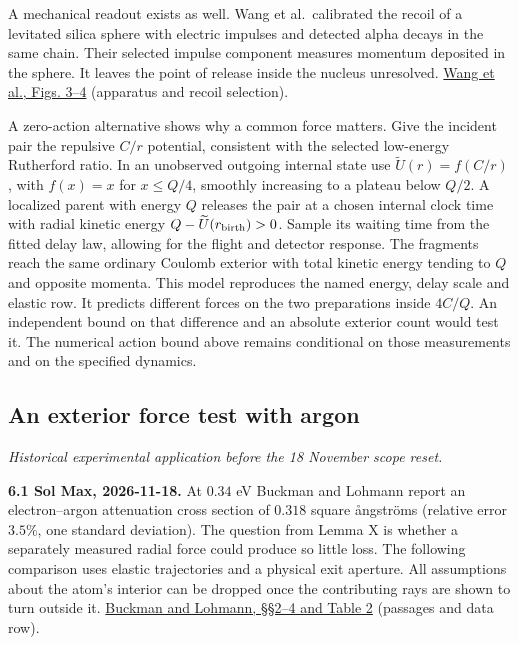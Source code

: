\documentclass[11pt,a4paper]{article}
\begin{document}
A mechanical readout exists as well. Wang et al.~calibrated the recoil
of a levitated silica sphere with electric impulses and detected alpha
decays in the same chain. Their selected impulse component measures
momentum deposited in the sphere. It leaves the point of release inside
the nucleus unresolved. \href{https://arxiv.org/pdf/2402.13257v2}{Wang
et al., Figs. 3--4} (apparatus and recoil selection).

A zero-action alternative shows why a common force matters. Give the
incident pair the repulsive \(C/r\) potential, consistent with the
selected low-energy Rutherford ratio. In an unobserved outgoing internal
state use \(\widetilde U(r)=f(C/r)\), with \(f(x)=x\) for \(x\le Q/4\),
smoothly increasing to a plateau below \(Q/2\). A localized parent with
energy \(Q\) releases the pair at a chosen internal clock time with
radial kinetic energy \(Q-\widetilde U(r_{\rm birth})>0\). Sample its
waiting time from the fitted delay law, allowing for the flight and
detector response. The fragments reach the same ordinary Coulomb
exterior with total kinetic energy tending to \(Q\) and opposite
momenta. This model reproduces the named energy, delay scale and elastic
row. It predicts different forces on the two preparations inside
\(4C/Q\). An independent bound on that difference and an absolute
exterior count would test it. The numerical action bound above remains
conditional on those measurements and on the specified dynamics.

\subsection{An exterior force test with
argon}\label{an-exterior-force-test-with-argon}

\emph{Historical experimental application before the 18 November scope
reset.}

\textbf{6.1 Sol Max, 2026-11-18.} At \(0.34\) eV Buckman and Lohmann
report an electron--argon attenuation cross section of \(0.318\) square
ångströms (relative error \(3.5\%\), one standard deviation). The
question from Lemma X is whether a separately measured radial force
could produce so little loss. The following comparison uses elastic
trajectories and a physical exit aperture. All assumptions about the
atom's interior can be dropped once the contributing rays are shown to
turn outside it.
\href{https://doi.org/10.1088/0022-3700/19/16/013}{Buckman and Lohmann,
§§2--4 and Table 2} (passages and data row).
\end{document}
